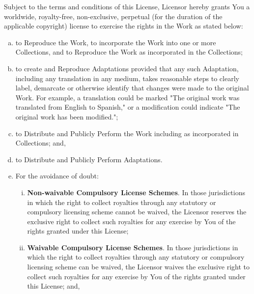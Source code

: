  Subject to the terms
        and conditions of this License, Licensor hereby grants You
        a worldwide, royalty-free, non-exclusive, perpetual (for
        the duration of the applicable copyright) license to
        exercise the rights in the Work as stated below:

\begin{enumerate}[a.]
          \item to Reproduce the Work, to incorporate the Work into
          one or more Collections, and to Reproduce the Work as
          incorporated in the Collections;

          \item to create and Reproduce Adaptations provided that any
          such Adaptation, including any translation in any medium,
          takes reasonable steps to clearly label, demarcate or
          otherwise identify that changes were made to the original
          Work. For example, a translation could be marked "The
          original work was translated from English to Spanish," or
          a modification could indicate "The original work has been
          modified.";

          \item to Distribute and Publicly Perform the Work including
          as incorporated in Collections; and,

          \item to Distribute and Publicly Perform Adaptations.

          \item
            For the avoidance of doubt:

\begin{enumerate}[i.]
              \item\textbf{Non-waivable Compulsory License
              Schemes}. In those jurisdictions in which the
              right to collect royalties through any statutory or
              compulsory licensing scheme cannot be waived, the
              Licensor reserves the exclusive right to collect such
              royalties for any exercise by You of the rights
              granted under this License;

              \item\textbf{Waivable Compulsory License
              Schemes}. In those jurisdictions in which the
              right to collect royalties through any statutory or
              compulsory licensing scheme can be waived, the
              Licensor waives the exclusive right to collect such
              royalties for any exercise by You of the rights
              granted under this License; and,


\end{enumerate}
\end{enumerate}

